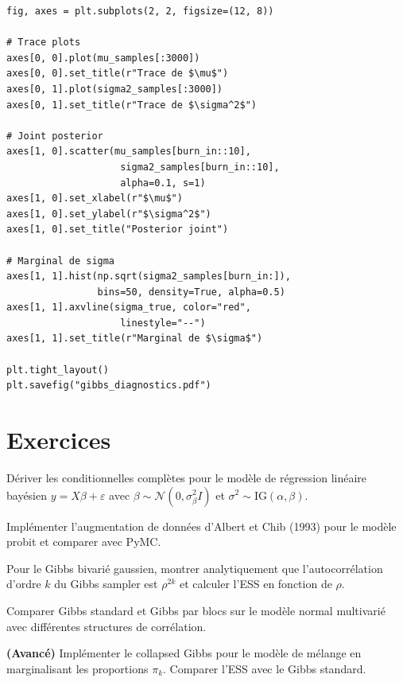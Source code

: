 \begin{codeblock}[title=\textbf{Diagnostics et visualisation}]
\begin{verbatim}
fig, axes = plt.subplots(2, 2, figsize=(12, 8))

# Trace plots
axes[0, 0].plot(mu_samples[:3000])
axes[0, 0].set_title(r"Trace de $\mu$")
axes[0, 1].plot(sigma2_samples[:3000])
axes[0, 1].set_title(r"Trace de $\sigma^2$")

# Joint posterior
axes[1, 0].scatter(mu_samples[burn_in::10],
                    sigma2_samples[burn_in::10],
                    alpha=0.1, s=1)
axes[1, 0].set_xlabel(r"$\mu$")
axes[1, 0].set_ylabel(r"$\sigma^2$")
axes[1, 0].set_title("Posterior joint")

# Marginal de sigma
axes[1, 1].hist(np.sqrt(sigma2_samples[burn_in:]),
                bins=50, density=True, alpha=0.5)
axes[1, 1].axvline(sigma_true, color="red",
                    linestyle="--")
axes[1, 1].set_title(r"Marginal de $\sigma$")

plt.tight_layout()
plt.savefig("gibbs_diagnostics.pdf")
\end{verbatim}
\end{codeblock}

\section{Exercices}

\begin{exercice}
D\'eriver les conditionnelles compl\`etes pour le mod\`ele de r\'egression
lin\'eaire bay\'esien $y = X\beta + \varepsilon$ avec
$\beta \sim \mathcal{N}(0, \sigma_\beta^2 I)$ et
$\sigma^2 \sim \text{IG}(\alpha, \beta)$.
\end{exercice}

\begin{exercice}
Impl\'ementer l'augmentation de donn\'ees d'Albert et Chib (1993) pour
le mod\`ele probit et comparer avec PyMC.
\end{exercice}

\begin{exercice}
Pour le Gibbs bivari\'e gaussien, montrer analytiquement que
l'autocorr\'elation d'ordre $k$ du Gibbs sampler est $\rho^{2k}$ et
calculer l'ESS en fonction de $\rho$.
\end{exercice}

\begin{exercice}
Comparer Gibbs standard et Gibbs par blocs sur le mod\`ele normal
multivari\'e avec diff\'erentes structures de corr\'elation.
\end{exercice}

\begin{exercice}
\textbf{(Avanc\'e)} Impl\'ementer le collapsed Gibbs pour le mod\`ele
de m\'elange en marginalisant les proportions $\pi_k$. Comparer l'ESS
avec le Gibbs standard.
\end{exercice}

